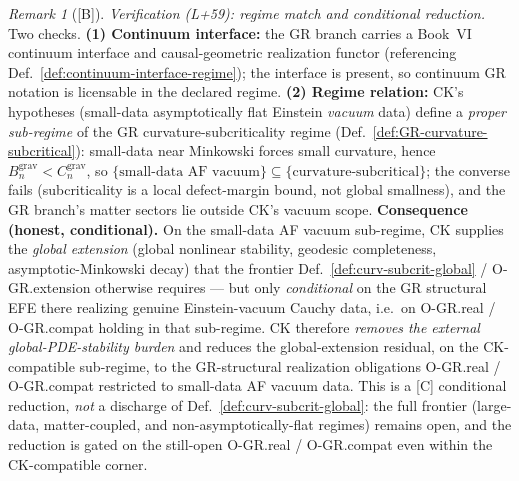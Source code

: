 \documentclass[12pt,oneside]{amsbook}
\theoremstyle{plain}
\theoremstyle{definition}
\theoremstyle{remark}
\newtheorem{remark}[theorem]{Remark}
\newcommand{\status}[1]{\textup{[#1]}}
\begin{document}
\begin{remark}[\status{B}]
\emph{Verification (L+59): regime match and conditional reduction.} Two
checks. \textbf{(1) Continuum interface:} the GR branch carries a Book~VI
continuum interface and causal-geometric realization functor
(referencing Def.~\ref{def:continuum-interface-regime}); the interface is
present, so continuum GR notation is licensable in the declared regime.
\textbf{(2) Regime relation:} CK's hypotheses (small-data asymptotically
flat Einstein \emph{vacuum} data) define a \emph{proper sub-regime} of the
GR curvature-subcriticality regime (Def.~\ref{def:GR-curvature-subcritical}):
small-data near Minkowski forces small curvature, hence
$B_n^{\mathrm{grav}} < C_n^{\mathrm{grav}}$, so
$\{\text{small-data AF vacuum}\} \subseteq \{\text{curvature-subcritical}\}$;
the converse fails (subcriticality is a local defect-margin bound, not
global smallness), and the GR branch's matter sectors lie outside CK's
vacuum scope. \textbf{Consequence (honest, conditional).} On the
small-data AF vacuum sub-regime, CK supplies the \emph{global extension}
(global nonlinear stability, geodesic completeness, asymptotic-Minkowski
decay) that the frontier Def.~\ref{def:curv-subcrit-global} /
O-GR.extension otherwise requires --- but only \emph{conditional} on the
GR structural EFE there realizing genuine Einstein-vacuum Cauchy data,
i.e.\ on O-GR.real / O-GR.compat holding in that sub-regime. CK therefore
\emph{removes the external global-PDE-stability burden} and reduces the
global-extension residual, on the CK-compatible sub-regime, to the
GR-structural realization obligations O-GR.real / O-GR.compat restricted
to small-data AF vacuum data. This is a \status{C} conditional reduction,
\emph{not} a discharge of Def.~\ref{def:curv-subcrit-global}: the full
frontier (large-data, matter-coupled, and non-asymptotically-flat regimes)
remains open, and the reduction is gated on the still-open O-GR.real /
O-GR.compat even within the CK-compatible corner.
\end{remark}
\end{document}
